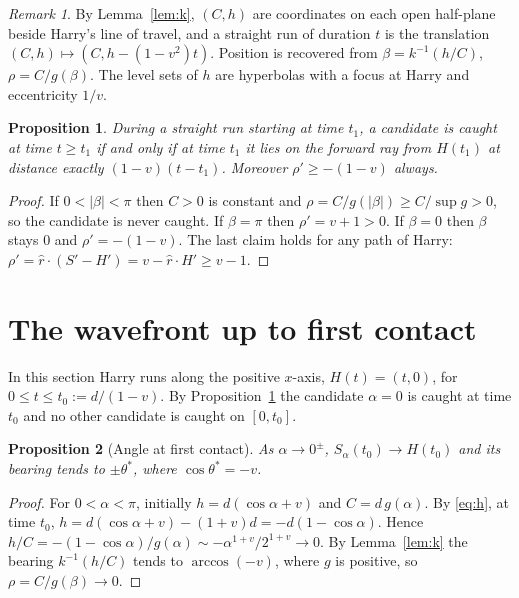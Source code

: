 \documentclass[11pt]{article}
\newtheorem{proposition}{Proposition}
\theoremstyle{remark}\newtheorem{remark}{Remark}
\newcommand{\rhat}{\hat r}
\begin{document}
\begin{remark}
By Lemma~\ref{lem:k}, $(C,h)$ are coordinates on each open half-plane beside Harry's line of travel, and a straight run of
duration $t$ is the translation $(C,h)\mapsto(C,h-(1-v^2)t)$. Position is recovered from $\beta=k^{-1}(h/C)$,
$\rho=C/g(\beta)$. The level sets of $h$ are hyperbolas with a focus at Harry and eccentricity $1/v$.
\end{remark}

\begin{proposition}\label{prop:ray}
During a straight run starting at time $t_1$, a candidate is caught at time $t\ge t_1$ if and only if at time $t_1$ it lies on
the forward ray from $H(t_1)$ at distance exactly $(1-v)(t-t_1)$. Moreover $\rho'\ge-(1-v)$ always.
\end{proposition}
\begin{proof}
If $0<|\beta|<\pi$ then $C>0$ is constant and $\rho=C/g(|\beta|)\ge C/\sup g>0$, so the candidate is never caught.
If $\beta=\pi$ then $\rho'=v+1>0$. If $\beta=0$ then $\beta$ stays $0$ and $\rho'=-(1-v)$.
The last claim holds for any path of Harry: $\rho'=\rhat\cdot(S'-H')=v-\rhat\cdot H'\ge v-1$.
\end{proof}

\section{The wavefront up to first contact}
In this section Harry runs along the positive $x$-axis, $H(t)=(t,0)$, for $0\le t\le t_0:=d/(1-v)$.
By Proposition~\ref{prop:ray} the candidate $\alpha=0$ is caught at time $t_0$ and no other candidate is caught on $[0,t_0]$.

\begin{proposition}[Angle at first contact]\label{prop:V}
As $\alpha\to0^{\pm}$, $S_\alpha(t_0)\to H(t_0)$ and its bearing tends to $\pm\theta^*$, where $\cos\theta^*=-v$.
\end{proposition}
\begin{proof}
For $0<\alpha<\pi$, initially $h=d(\cos\alpha+v)$ and $C=d\,g(\alpha)$. By \eqref{eq:h}, at time $t_0$,
$h=d(\cos\alpha+v)-(1+v)d=-d(1-\cos\alpha)$. Hence
$h/C=-(1-\cos\alpha)/g(\alpha)\sim-\alpha^{1+v}/2^{1+v}\to0$. By Lemma~\ref{lem:k} the bearing
$k^{-1}(h/C)$ tends to $\arccos(-v)$, where $g$ is positive, so $\rho=C/g(\beta)\to0$.
\end{proof}
\end{document}
